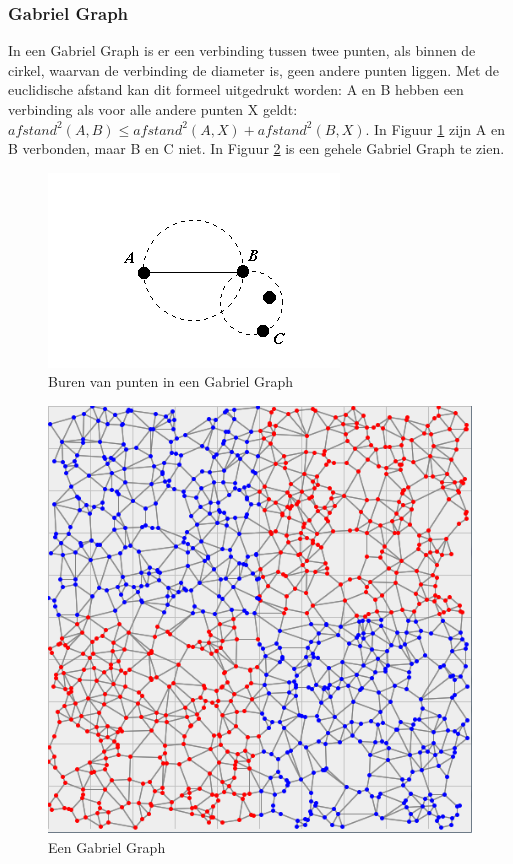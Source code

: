 \documentclass{article}
\begin{document}
\subsubsection{Gabriel Graph}
In een Gabriel Graph is er een verbinding tussen twee punten, als binnen de cirkel, waarvan de verbinding de diameter is, geen andere punten liggen. Met de euclidische afstand kan dit formeel uitgedrukt worden: A en B hebben een verbinding als voor alle andere punten X geldt: ${afstand^2}(A,B) \leq {afstand^2(A,X)} + {afstand^2}(B,X)$. In Figuur \ref{GGburen} zijn A en B verbonden, maar B en C niet. In Figuur \ref{graaf_xor_GG} is een gehele Gabriel Graph te zien. \\

\begin{figure}[!h]
    \centering
        \includegraphics[scale=1, page=1]{GGburen}
    \caption{Buren van punten in een Gabriel Graph}
    \label{GGburen}
\end{figure}

\begin{figure}[!h]
    \centering
        \includegraphics[scale=0.5, page=1]{graaf_xor_GG}
    \caption{Een Gabriel Graph}
    \label{graaf_xor_GG}
\end{figure}
\clearpage
\end{document}
